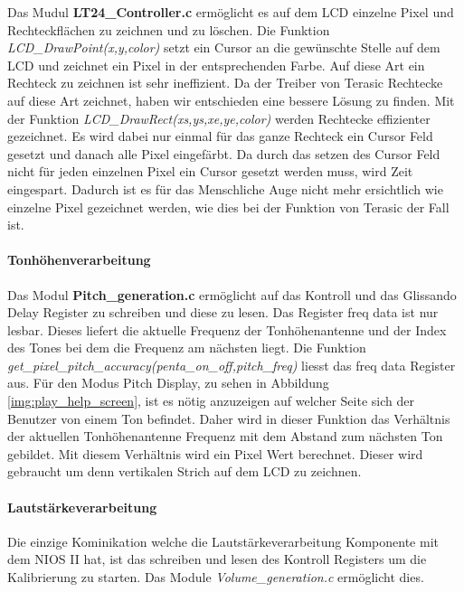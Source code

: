 Das Mudul \textbf{LT24\_Controller.c} ermöglicht es auf dem LCD einzelne Pixel und Rechteckflächen zu zeichnen und zu löschen. Die Funktion \textit{LCD\_DrawPoint(x,y,color)} setzt ein Cursor an die gewünschte Stelle auf dem LCD und zeichnet ein Pixel in der entsprechenden Farbe. Auf diese Art ein Rechteck zu zeichnen ist sehr ineffizient. Da der Treiber von Terasic Rechtecke auf diese Art zeichnet, haben wir entschieden eine bessere Lösung zu finden. Mit der Funktion \textit{LCD\_DrawRect(xs,ys,xe,ye,color)}  werden Rechtecke effizienter gezeichnet. Es wird dabei nur einmal für das ganze Rechteck ein Cursor Feld gesetzt und danach alle Pixel eingefärbt. Da durch das setzen des Cursor Feld nicht für jeden einzelnen Pixel ein Cursor gesetzt werden muss, wird  Zeit eingespart. Dadurch ist es für das Menschliche Auge nicht mehr ersichtlich wie einzelne Pixel gezeichnet werden, wie dies bei der Funktion von Terasic der Fall ist. 

\paragraph{Tonhöhenverarbeitung}
Das Modul \textbf{Pitch\_generation.c} ermöglicht auf das Kontroll und das Glissando Delay Register zu schreiben und diese zu lesen. Das Register freq data ist nur lesbar. Dieses liefert die aktuelle Frequenz der Tonhöhenantenne und der Index des Tones bei dem die Frequenz am nächsten liegt. 
Die Funktion \textit{get\_pixel\_pitch\_accuracy(penta\_on\_off,pitch\_freq)} liesst das freq data Register aus. Für den Modus Pitch Display, zu sehen in Abbildung \ref{img:play_help_screen}, ist es nötig anzuzeigen auf welcher Seite sich der Benutzer von einem Ton befindet. Daher wird in dieser Funktion das Verhältnis der aktuellen Tonhöhenantenne Frequenz mit dem Abstand zum nächsten Ton gebildet. Mit diesem Verhältnis wird ein Pixel Wert berechnet. Dieser wird gebraucht um denn vertikalen Strich auf dem LCD zu zeichnen.


\paragraph{Lautstärkeverarbeitung}
Die einzige Kominikation welche die Lautstärkeverarbeitung Komponente mit dem NIOS II hat, ist das schreiben und lesen des Kontroll Registers um die Kalibrierung zu starten. Das Module  \textit{Volume\_generation.c} ermöglicht dies. 